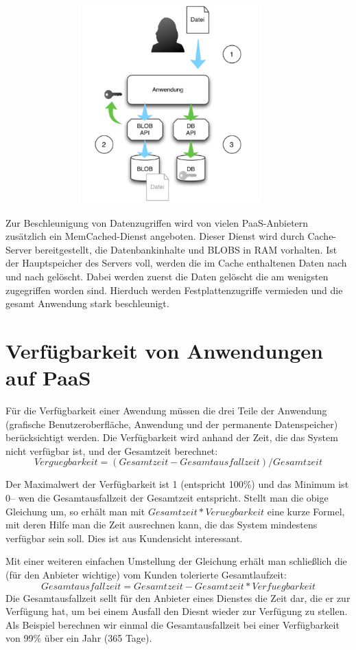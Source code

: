 \documentclass[a4paper,10pt]{article}
\begin{document}
\begin{center}
	\includegraphics[width=5in,height=3in]{blob.png}
\end{center}
Zur Beschleunigung von Datenzugriffen wird von vielen PaaS-Anbietern zusätzlich ein MemCached-Dienst angeboten. Dieser Dienst wird durch Cache-Server bereitgestellt, die Datenbankinhalte und BLOBS in RAM vorhalten. Ist der Hauptspeicher des Servers voll, werden die im Cache enthaltenen Daten nach und nach gelöscht. Dabei werden zuerst die Daten gelöscht die am wenigsten zugegriffen worden sind. Hierduch werden Festplattenzugriffe vermieden und die gesamt Anwendung stark beschleunigt.
\section{Verfügbarkeit von Anwendungen auf PaaS}
Für die Verfügbarkeit einer Awendung müssen die drei Teile der Anwendung (grafische Benutzeroberfläche, Anwendung und der permanente Datenspeicher) berücksichtigt werden. Die Verfügbarkeit wird anhand der Zeit, die das System nicht verfügbar ist, und der Gesamtzeit berechnet:
$$ Verguegbarkeit=(Gesamtzeit-Gesamtausfallzeit)/Gesamtzeit $$

Der Maximalwert der Verfügbarkeit ist 1 (entspricht 100\%) und das Minimum ist 0-- wen die Gesamtausfallzeit der Gesamtzeit entspricht. Stellt man die obige Gleichung um, so erhält man mit $ Gesamtzeit*Veruegbarkeit $ eine kurze Formel, mit deren Hilfe man die Zeit ausrechnen kann, die das System mindestens verfügbar sein soll. Dies ist aus Kundensicht interessant.


\vspace{3mm}
Mit einer weiteren einfachen Umstellung der Gleichung erhält man schließlich die (für den Anbieter wichtige) vom Kunden tolerierte Gesamtlaufzeit:
$$ Gesamtausfallzeit = Gesamtzeit - Gesamtzeit * Verfuegbarkeit $$
Die Gesamtausfallzeit sellt für den Anbieter eines Dienstes die Zeit dar, die er zur Verfügung hat, um bei einem Ausfall den Diesnt wieder zur Verfügung zu stellen. Als Beispiel berechnen wir einmal die Gesamtausfallzeit bei einer Verfügbarkeit von 99\% über ein Jahr (365 Tage).
\end{document}
